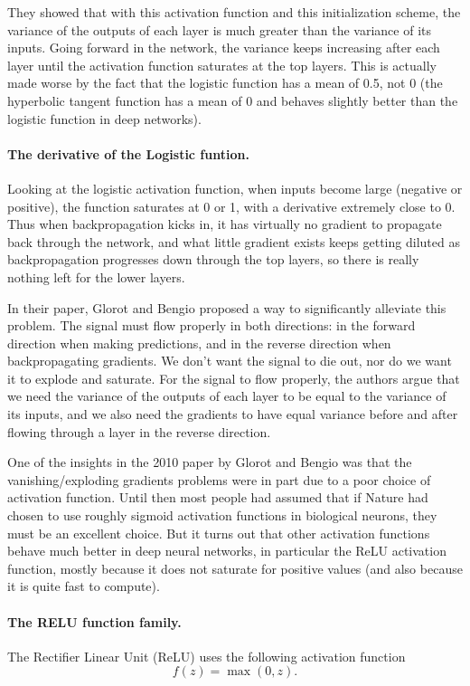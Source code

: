\documentclass[%
oneside,                 %
final,                   %
10pt]{article}
\begin{document}
They showed that with this activation function and this
initialization scheme, the variance of the outputs of each layer is
much greater than the variance of its inputs. Going forward in the
network, the variance keeps increasing after each layer until the
activation function saturates at the top layers. This is actually made
worse by the fact that the logistic function has a mean of 0.5, not 0
(the hyperbolic tangent function has a mean of 0 and behaves slightly
better than the logistic function in deep networks).


\paragraph{The derivative of the Logistic funtion.}
Looking at the logistic activation function, when inputs become large
(negative or positive), the function saturates at 0 or 1, with a
derivative extremely close to 0. Thus when backpropagation kicks in,
it has virtually no gradient to propagate back through the network,
and what little gradient exists keeps getting diluted as
backpropagation progresses down through the top layers, so there is
really nothing left for the lower layers.

In their paper, Glorot and Bengio proposed a way to significantly
alleviate this problem. The signal must flow properly in both
directions: in the forward direction when making predictions, and in
the reverse direction when backpropagating gradients. We don’t want
the signal to die out, nor do we want it to explode and saturate. For
the signal to flow properly, the authors argue that we need the
variance of the outputs of each layer to be equal to the variance of
its inputs, and we also need the gradients to have equal variance
before and after flowing through a layer in the reverse direction.



One of the insights in the 2010 paper by Glorot and Bengio was that
the vanishing/exploding gradients problems were in part due to a poor
choice of activation function. Until then most people had assumed that
if Nature had chosen to use roughly sigmoid activation functions in
biological neurons, they must be an excellent choice. But it turns out
that other activation functions behave much better in deep neural
networks, in particular the ReLU activation function, mostly because
it does not saturate for positive values (and also because it is quite
fast to compute).


\paragraph{The RELU function family.}
The Rectifier Linear Unit (ReLU) uses the following activation function
\[
f(z) = \max(0,z).
\]
\end{document}
